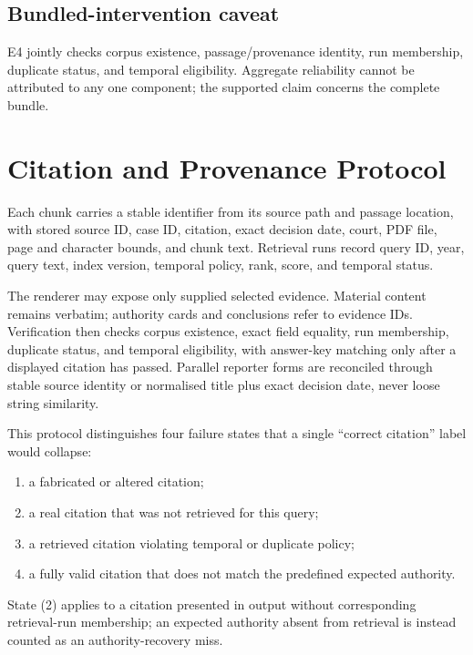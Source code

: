 \documentclass[conference]{IEEEtran}
\begin{document}
\subsection{Bundled-intervention caveat}

E4 jointly checks corpus existence,
passage/provenance identity, run membership, duplicate
status, and temporal eligibility. Aggregate reliability cannot be attributed to any one
component; the supported claim concerns the complete bundle.

\section{Citation and Provenance Protocol}
\label{sec:protocol}

Each chunk carries a stable identifier from its source path and
passage location, with stored source ID, case ID, citation, exact decision date, court, PDF
file, page and character bounds, and chunk text. Retrieval runs record query ID, year,
query text, index version, temporal policy, rank, score, and temporal status.

The renderer may expose only supplied selected evidence. Material content
remains verbatim; authority cards and conclusions refer to evidence IDs.
Verification then checks corpus existence, exact field equality, run membership,
duplicate status, and temporal eligibility, with answer-key matching only
after a displayed citation has passed. Parallel reporter forms are
reconciled through stable source identity or normalised title plus exact
decision date, never loose string similarity.

This protocol distinguishes four failure states that a single
``correct citation'' label would collapse:

\begin{enumerate}
\item a fabricated or altered citation;
\item a real citation that was not retrieved for this query;
\item a retrieved citation violating temporal or duplicate policy;
\item a fully valid citation that does not match the predefined expected
authority.
\end{enumerate}

State (2) applies to a citation presented in output without corresponding retrieval-run membership; an expected authority absent from retrieval is instead counted as an authority-recovery miss.
\end{document}
